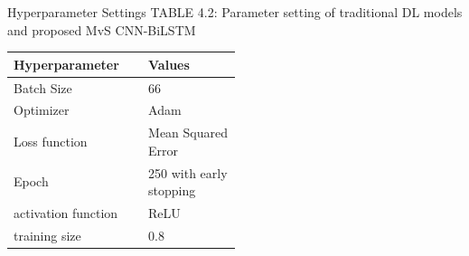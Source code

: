 \documentclass[12pt, aspectratio=169]{beamer}
\begin{document}
\begin{frame}{Hyperparameter Settings}
	\centering
	\scriptsize {TABLE 4.2:  Parameter setting of traditional DL models and proposed
	MvS CNN-BiLSTM}\\
	\begin{table}
		\begin{tabular}{|p{0.2\linewidth}|p{0.3\linewidth}|}
			\hline
			\footnotesize \textbf{Hyperparameter} & \footnotesize \textbf{Values} \\ \hline
			Batch Size               & 66                     \\ \hline
			Optimizer                 & Adam                   \\ \hline
			Loss function            & Mean Squared Error      \\ \hline
			Epoch                    & 250 with early stopping \\ \hline
			activation function      & ReLU                   \\ \hline
			training size             & 0.8                   \\ \hline
		\end{tabular}
	\end{table}
\end{frame}



\end{document}
